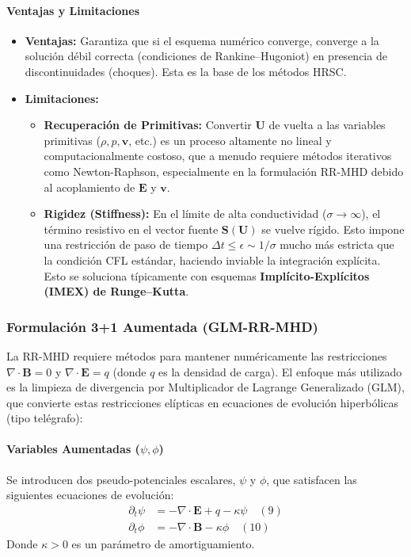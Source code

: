 \paragraph{Ventajas y Limitaciones}
\begin{itemize}
    \item \textbf{Ventajas:} Garantiza que si el esquema numérico converge, converge a la solución débil correcta (condiciones de Rankine–Hugoniot) en presencia de discontinuidades (choques). Esta es la base de los métodos HRSC.
    \item \textbf{Limitaciones:}
    \begin{itemize}
        \item \textbf{Recuperación de Primitivas:} Convertir $\mathbf{U}$ de vuelta a las variables primitivas ($\rho, p, \mathbf{v}$, etc.) es un proceso altamente no lineal y computacionalmente costoso, que a menudo requiere métodos iterativos como Newton-Raphson, especialmente en la formulación RR-MHD debido al acoplamiento de $\mathbf{E}$ y $\mathbf{v}$.
        \item \textbf{Rigidez (Stiffness):} En el límite de alta conductividad ($\sigma \to \infty$), el término resistivo en el vector fuente $\mathbf{S}(\mathbf{U})$ se vuelve rígido. Esto impone una restricción de paso de tiempo $\Delta t \le \epsilon \sim 1/\sigma$ mucho más estricta que la condición CFL estándar, haciendo inviable la integración explícita. Esto se soluciona típicamente con esquemas \textbf{Implícito-Explícitos (IMEX) de Runge–Kutta}.
    \end{itemize}
\end{itemize}

\subsubsection{Formulación 3+1 Aumentada (GLM-RR-MHD)}

La RR-MHD requiere métodos para mantener numéricamente las restricciones $\nabla \cdot \mathbf{B} = 0$ y $\nabla \cdot \mathbf{E} = q$ (donde $q$ es la densidad de carga). El enfoque más utilizado es la limpieza de divergencia por Multiplicador de Lagrange Generalizado (GLM), que convierte estas restricciones elípticas en ecuaciones de evolución hiperbólicas (tipo telégrafo):

\paragraph{Variables Aumentadas ($\psi, \phi$)}
Se introducen dos pseudo-potenciales escalares, $\psi$ y $\phi$, que satisfacen las siguientes ecuaciones de evolución:
\begin{align}
\partial_t \psi &= -\nabla \cdot \mathbf{E} + q - \kappa\psi \quad (9) \\
\partial_t \phi &= -\nabla \cdot \mathbf{B} - \kappa\phi \quad (10)
\end{align}
Donde $\kappa > 0$ es un parámetro de amortiguamiento.


